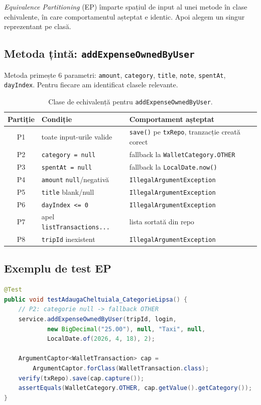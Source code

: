 \textit{Equivalence Partitioning} (EP) împarte spațiul de input al unei metode în clase echivalente, în care comportamentul așteptat e identic. Apoi alegem un singur reprezentant pe clasă.

\subsection{Metoda țintă: \texttt{addExpenseOwnedByUser}}

Metoda primește 6 parametri: \texttt{amount}, \texttt{category}, \texttt{title}, \texttt{note}, \texttt{spentAt}, \texttt{dayIndex}. Pentru fiecare am identificat clasele relevante.

\begin{table}[!htb]
\centering
\caption{Clase de echivalență pentru \texttt{addExpenseOwnedByUser}.}
\label{tab:ep-classes}
\begin{tabularx}{\linewidth}{clX}
\toprule
\textbf{Partiție} & \textbf{Condiție} & \textbf{Comportament așteptat} \\
\midrule
P1 & toate input-urile valide & \texttt{save()} pe \texttt{txRepo}, tranzacție creată corect \\
P2 & \texttt{category = null} & fallback la \texttt{WalletCategory.OTHER} \\
P3 & \texttt{spentAt = null} & fallback la \texttt{LocalDate.now()} \\
P4 & \texttt{amount} \texttt{null}/negativă & \texttt{IllegalArgumentException} \\
P5 & \texttt{title} blank/null & \texttt{IllegalArgumentException} \\
P6 & \texttt{dayIndex <= 0} & \texttt{IllegalArgumentException} \\
P7 & apel \texttt{listTransactions...} & lista sortată din repo \\
P8 & \texttt{tripId} inexistent & \texttt{IllegalArgumentException} \\
\bottomrule
\end{tabularx}
\end{table}

\subsection{Exemplu de test EP}

\begin{lstlisting}[language=Java, caption={Test pentru P2 - categorie nulă.}]
@Test
public void testAdaugaCheltuiala_CategorieLipsa() {
    // P2: categorie null -> fallback OTHER
    service.addExpenseOwnedByUser(tripId, login,
            new BigDecimal("25.00"), null, "Taxi", null,
            LocalDate.of(2026, 4, 18), 2);

    ArgumentCaptor<WalletTransaction> cap =
        ArgumentCaptor.forClass(WalletTransaction.class);
    verify(txRepo).save(cap.capture());
    assertEquals(WalletCategory.OTHER, cap.getValue().getCategory());
}
\end{lstlisting}

